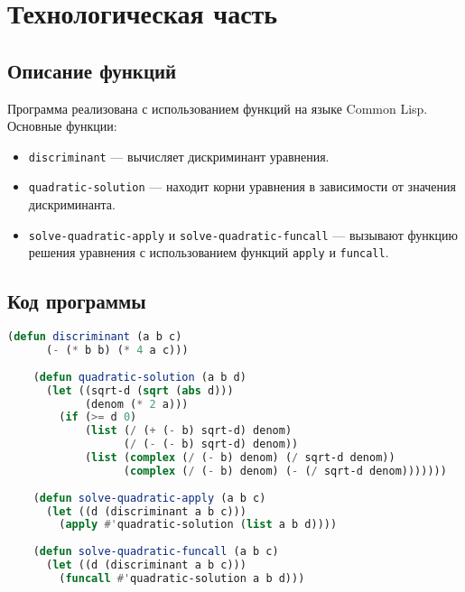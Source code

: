 \chapter{Технологическая часть}

\section{Описание функций}
Программа реализована с использованием функций на языке Common Lisp. Основные функции:
\begin{itemize}
	\item \texttt{discriminant} — вычисляет дискриминант уравнения.
	\item \texttt{quadratic-solution} — находит корни уравнения в зависимости от значения дискриминанта.
	\item \texttt{solve-quadratic-apply} и \texttt{solve-quadratic-funcall} — вызывают функцию решения уравнения с использованием функций \texttt{apply} и \texttt{funcall}.
\end{itemize}

\section{Код программы}
\begin{lstlisting}[language=Lisp, caption={Функции для нахождения корней квадратного уравнения}]
	(defun discriminant (a b c)
	  (- (* b b) (* 4 a c)))
	
	(defun quadratic-solution (a b d)
	  (let ((sqrt-d (sqrt (abs d)))
	        (denom (* 2 a)))
	    (if (>= d 0)
	        (list (/ (+ (- b) sqrt-d) denom)
	              (/ (- (- b) sqrt-d) denom))
	        (list (complex (/ (- b) denom) (/ sqrt-d denom))
          	      (complex (/ (- b) denom) (- (/ sqrt-d denom)))))))
	
	(defun solve-quadratic-apply (a b c)
	  (let ((d (discriminant a b c)))
	    (apply #'quadratic-solution (list a b d))))
	
	(defun solve-quadratic-funcall (a b c)
	  (let ((d (discriminant a b c)))
	    (funcall #'quadratic-solution a b d)))
\end{lstlisting}


